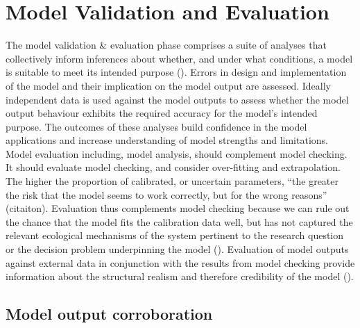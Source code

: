 \documentclass[
]{article}
\begin{document}
\section{Model Validation and
Evaluation}\label{model-validation-and-evaluation}

\begin{tcolorbox}[enhanced jigsaw, opacityback=0, left=2mm, opacitybacktitle=0.6, breakable, toptitle=1mm, rightrule=.15mm, titlerule=0mm, leftrule=.75mm, title=\textcolor{quarto-callout-note-color}{\faInfo}\hspace{0.5em}{Explanation}, colback=white, arc=.35mm, bottomtitle=1mm, bottomrule=.15mm, colframe=quarto-callout-note-color-frame, coltitle=black, colbacktitle=quarto-callout-note-color!10!white, toprule=.15mm]

The model validation \& evaluation phase comprises a suite of analyses
that collectively inform inferences about whether, and under what
conditions, a model is suitable to meet its intended purpose
(). Errors in
design and implementation of the model and their implication on the
model output are assessed. Ideally independent data is used against the
model outputs to assess whether the model output behaviour exhibits the
required accuracy for the model's intended purpose. The outcomes of
these analyses build confidence in the model applications and increase
understanding of model strengths and limitations. Model evaluation
including, model analysis, should complement model checking. It should
evaluate model checking, and consider over-fitting and extrapolation.
The higher the proportion of calibrated, or uncertain parameters, ``the
greater the risk that the model seems to work correctly, but for the
wrong reasons'' (citaiton). Evaluation thus complements model checking
because we can rule out the chance that the model fits the calibration
data well, but has not captured the relevant ecological mechanisms of
the system pertinent to the research question or the decision problem
underpinning the model (). Evaluation of model outputs against external data in conjunction
with the results from model checking provide information about the
structural realism and therefore credibility of the model
().

\end{tcolorbox}

\subsection{Model output
corroboration}\label{model-output-corroboration}
\end{document}
